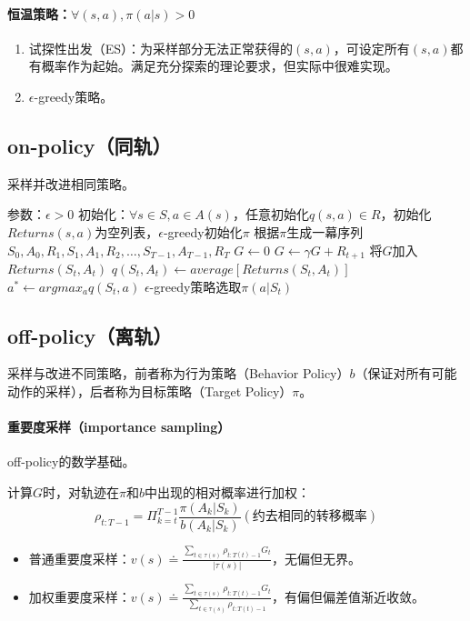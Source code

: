 \documentclass[
12pt, %
a4paper, 
oneside, %
headinclude,footinclude, %
]{scrartcl}
\begin{document}
\paragraph{恒温策略：$ \forall(s, a), \pi(a|s) > 0 $}
\begin{enumerate}
\item 试探性出发（ES）：为采样部分无法正常获得的$ (s, a) $，可设定所有$ (s, a) $都有概率作为起始。满足充分探索的理论要求，但实际中很难实现。
\item $ \epsilon $-greedy策略。
\end{enumerate}
\subsection[on-policy]{on-policy（同轨）}
采样并改进相同策略。
\begin{myalgorithm}
\State 参数：$ \epsilon > 0 $
\State 初始化：$ \forall s \in S, a \in A(s) $，任意初始化$ q(s,a) \in R $，初始化$ Returns(s,a) $为空列表，$ \epsilon $-greedy初始化$ \pi $
\Loop
\State 根据$ \pi $生成一幕序列$ S_0, A_0, R_1, S_1, A_1, R_2, \dots, S_{T - 1}, A_{T - 1}, R_T $
\State $ G \gets 0 $
\State $ G \gets \gamma G + R_{t + 1} $
\State 将$ G $加入$ Returns(S_t,A_t) $
\State $ q(S_t, A_t) \gets average[Returns(S_t, A_t)] $
\State $ a^* \gets argmax_a q(S_t, a) $
\State $ \epsilon $-greedy策略选取$ \pi(a|S_t) $
\EndIf
\EndFor
\EndLoop
\end{myalgorithm}
\subsection[off-policy]{off-policy（离轨）}
采样与改进不同策略，前者称为行为策略（Behavior Policy）$ b $（保证对所有可能动作的采样），后者称为目标策略（Target Policy）$ \pi $。
\paragraph{重要度采样（importance sampling）}\label{sec:MC back}
off-policy的数学基础。

计算$ G $时，对轨迹在$ \pi $和$ b $中出现的相对概率进行加权：
$$ \rho_{t:T - 1} = \Pi_{k = t}^{T - 1} \frac{\pi(A_k|S_k)}{b(A_k|S_k)} (\text{约去相同的转移概率}) $$
\begin{itemize}
\item 普通重要度采样：$ v(s) \doteq \frac{\sum_{t \in \tau(s)} \rho_{t:T(t) - 1}G_t}{|\tau(s)|} $，无偏但无界。
\item 加权重要度采样：$ v(s) \doteq \frac{\sum_{t \in \tau(s)} \rho_{t:T(t) - 1}G_t}{\sum_{t \in \tau(s)} \rho_{t:T(t) - 1}} $，有偏但偏差值渐近收敛。
\end{itemize}
\end{document}
